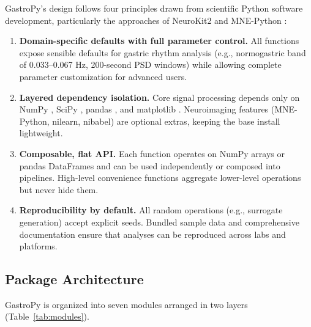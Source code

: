 \documentclass[12pt]{article}
\begin{document}
GastroPy's design follows four principles drawn from scientific Python
software development, particularly the approaches of NeuroKit2
\citep{Makowski2021} and MNE-Python \citep{Gramfort2013}:

\begin{enumerate}
  \item \textbf{Domain-specific defaults with full parameter control.} All
    functions expose sensible defaults for gastric rhythm analysis (e.g.,
    normogastric band of 0.033--0.067 Hz, 200-second PSD windows) while
    allowing complete parameter customization for advanced users.
  \item \textbf{Layered dependency isolation.} Core signal processing depends
    only on NumPy \citep{Harris2020}, SciPy \citep{Virtanen2020}, pandas
    \citep{McKinney2010}, and matplotlib \citep{Hunter2007}. Neuroimaging
    features (MNE-Python, nilearn, nibabel) are optional extras, keeping the
    base install lightweight.
  \item \textbf{Composable, flat API.} Each function operates on NumPy arrays
    or pandas DataFrames and can be used independently or composed into
    pipelines. High-level convenience functions aggregate lower-level
    operations but never hide them.
  \item \textbf{Reproducibility by default.} All random operations (e.g.,
    surrogate generation) accept explicit seeds. Bundled sample data and
    comprehensive documentation ensure that analyses can be reproduced across
    labs and platforms.
\end{enumerate}

\subsection{Package Architecture}

GastroPy is organized into seven modules arranged in two layers
(Table~\ref{tab:modules}).
\end{document}
